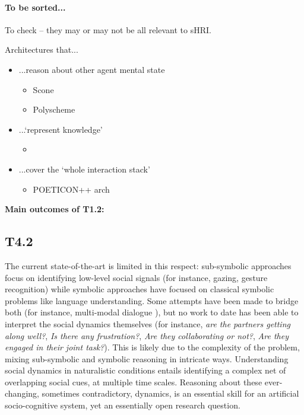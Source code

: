 \documentclass[11pt,a4paper]{report}
\begin{document}
\paragraph{To be sorted...}

To check -- they may or may not be all relevant to sHRI.

Architectures that...

\begin{itemize}
    \item ...reason about other agent mental state
    \begin{itemize}
        \item Scone~\cite{fahlman2011using}
        \item Polyscheme~\cite{bello2011shared}
    \end{itemize}
    \item ...`represent knowledge'
        \begin{itemize}
            \item \cite{zhang2014towards}
        \end{itemize}
    \item ...cover the `whole interaction stack'
        \begin{itemize}
            \item POETICON++ arch~\cite{antunes2016from} 
        \end{itemize}
\end{itemize}

\begin{framed}
    {\bf Main outcomes of T1.2:}
\end{framed}

\subsection{T4.2}

The current state-of-the-art is limited in this respect: sub-symbolic
approaches focus on identifying low-level social signals (for instance,
gazing, gesture recognition) while symbolic approaches have focused on
classical symbolic problems like language understanding. Some attempts
have been made to bridge both (for instance, multi-modal dialogue
\cite{lemaignan2011grounding, lemaignan2017artificial}), but no work to
date has been able to interpret the social dynamics themselves (for
instance, \emph{are the partners getting along well?}, \emph{Is there
any frustration?}, \emph{Are they collaborating or not?}, \emph{Are they
engaged in their joint task?}). This is likely due to the complexity of
the problem, mixing sub-symbolic and symbolic reasoning in intricate
ways. Understanding social dynamics in naturalistic conditions entails
identifying a complex net of overlapping social cues, at multiple time
scales. Reasoning about these ever-changing, sometimes contradictory,
dynamics, is an essential skill for an artificial socio-cognitive
system, yet an essentially open research question.
\end{document}
